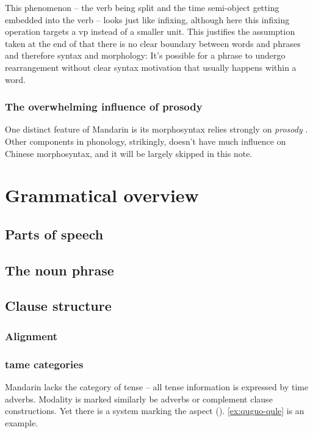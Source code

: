 \documentclass[UTF8, a4paper, oneside, scheme=plain]{ctexrep}
\begin{document}
This phenomenon -- the verb being split and the time semi-object getting embedded into the verb -- 
looks just like infixing,
although here this infixing operation targets a \acs{vp} instead of a smaller unit.
This justifies the assumption taken at the end of 
that there is no clear boundary between words and phrases 
and therefore syntax and morphology:
It's possible for a phrase to undergo 
rearrangement without clear syntax motivation
that usually happens within a word.

\subsection{The overwhelming influence of prosody}

One distinct feature of Mandarin is its morphosyntax relies strongly on \emph{prosody} \citep{feng2000}. 
Other components in phonology, strikingly, 
doesn't have much influence on Chinese morphosyntax,
and it will be largely skipped in this note.



\chapter{Grammatical overview}


\section{Parts of speech}

\section{The noun phrase}


\section{Clause structure}

\subsection{Alignment}



\subsection{\acs{tame} categories}

Mandarin lacks the category of tense -- 
all tense information is expressed by time adverbs.
Modality is marked similarly be adverbs or complement clause constructions.
Yet there is a system marking the aspect (). 
\eqref{ex:quguo-qule} is an example.
\end{document}
